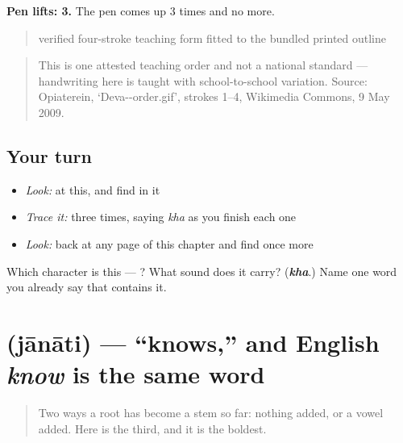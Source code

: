 \textbf{Pen lifts: 3.} The pen comes up 3 times and no more.

\begin{quote}
verified four-stroke teaching form fitted to the bundled printed outline
\end{quote}

\begin{quote}
This is one attested teaching order and not a national standard — handwriting here is taught with school-to-school variation. Source: Opiaterein, ‘Deva--order.gif’, strokes 1–4, Wikimedia Commons, 9 May 2009.
\end{quote}

\subsection*{Your turn}
\begin{itemize}
\raggedright
  \item \emph{Look:} at this, and find  in it
\end{itemize}

\begin{quote}
\end{quote}

\begin{itemize}
\raggedright
  \item \emph{Trace it:}  three times, saying \emph{kha} as you finish each one
  \item \emph{Look:} back at any page of this chapter and find  once more
\end{itemize}

\begin{tcolorbox}[breakable,colback=teal!4,colframe=teal!35!black,title={Before you move on}]
Which character is this — ? What sound does it carry? (\emph{\textbf{kha}}.) Name one word you already say that contains it.
\end{tcolorbox}
\section[\texorpdfstring{\sk{जानाति} (jānāti)}{जानाति (jānāti)}]{ (jānāti) — \textquotedblleft{}knows,\textquotedblright{} and English \emph{know} is the same word}

\label{lesson:SA-C07-janati}



\begin{quote}
Two ways a root has become a stem so far: nothing added, or a vowel added. Here is the third, and it is the boldest.
\end{quote}

